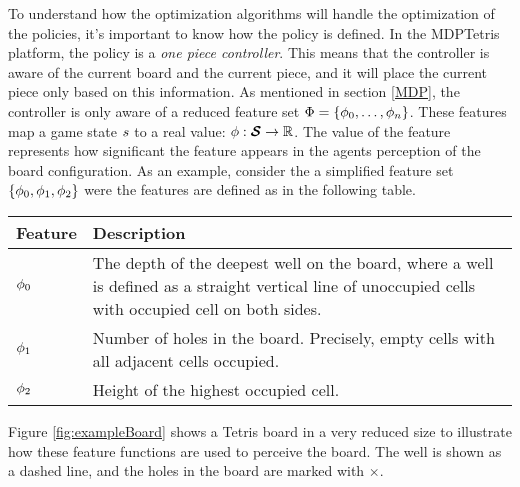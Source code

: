 To understand how the optimization algorithms will handle 
the optimization of the policies, it's important to
know how the policy is defined. In the MDPTetris platform,
the policy is a \textit{one piece controller}. This means that the controller
is aware of the current board and the current piece, and it will place
the current piece only based on this information. As mentioned 
in section \ref{MDP}, the controller is only aware of a reduced 
feature set $\Phi = \{\phi_0,\dots,\phi_n\}$.
These features map a game state $s$ to a real value:
$\phi : \boldsymbol{\mathcal{S}} \rightarrow \mathbb{R}$. The value of the 
feature represents how significant the feature appears in the agents 
perception of the board configuration. 
As an example, consider the a simplified feature set 
$\{\phi_0,\phi_1,\phi_2\}$ were the features are defined 
as in the following table.

\begin{center}
\begin{tabular}{l L{10cm}}
\textbf{Feature} & \textbf{Description}\\
\hline
$\phi_0$ & 
The depth of the deepest 
well on the board, where a well
is defined as a straight vertical 
line of unoccupied cells with 
occupied cell on both sides.\\
\hline
$\phi_1$ & 
Number of holes in the board. Precisely, empty cells
with all adjacent cells occupied.\\
\hline
$\phi_2$ & Height of the highest occupied cell.\\
\hline
\end{tabular}
\end{center}

Figure \ref{fig:exampleBoard} shows a Tetris board in a very reduced size
to illustrate how these feature functions are used to perceive the board.
The well is shown as a dashed line, and the holes in the board 
are marked with $\times$.


